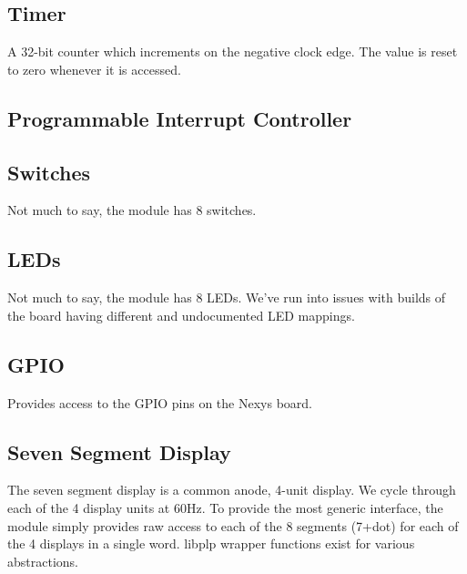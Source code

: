 \documentclass{article}
\begin{document}
\subsection{Timer}

A 32-bit counter which increments on the negative clock edge. The value is reset to zero whenever it is accessed. 

\subsection{Programmable Interrupt Controller}

\subsection{Switches}
Not much to say, the module has 8 switches.

\subsection{LEDs}
Not much to say, the module has 8 LEDs. We've run into issues with builds of the board having different and undocumented LED mappings.

\subsection{GPIO}
Provides access to the GPIO pins on the Nexys board.

\subsection{Seven Segment Display}
The seven segment display is a common anode, 4-unit display. We cycle through each of the 4 display units at 60Hz. To provide the most generic interface, the module simply provides raw access to each of the 8 segments (7+dot) for each of the 4 displays in a single word. libplp wrapper functions exist for various abstractions.
\end{document}
